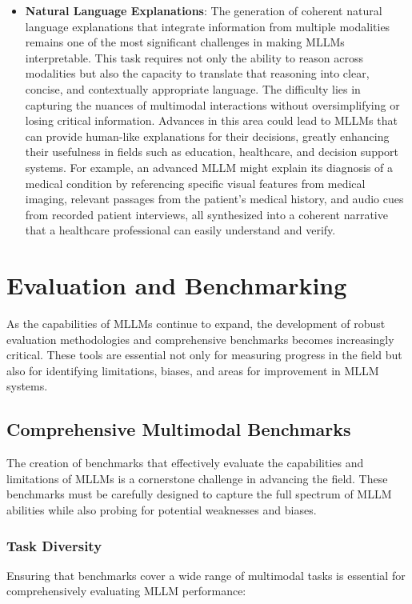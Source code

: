 \begin{itemize}
    \item \textbf{Natural Language Explanations}: The generation of coherent natural language explanations that integrate information from multiple modalities remains one of the most significant challenges in making MLLMs interpretable. This task requires not only the ability to reason across modalities but also the capacity to translate that reasoning into clear, concise, and contextually appropriate language. The difficulty lies in capturing the nuances of multimodal interactions without oversimplifying or losing critical information. Advances in this area could lead to MLLMs that can provide human-like explanations for their decisions, greatly enhancing their usefulness in fields such as education, healthcare, and decision support systems. For example, an advanced MLLM might explain its diagnosis of a medical condition by referencing specific visual features from medical imaging, relevant passages from the patient's medical history, and audio cues from recorded patient interviews, all synthesized into a coherent narrative that a healthcare professional can easily understand and verify.
\end{itemize}

\section{Evaluation and Benchmarking}

As the capabilities of MLLMs continue to expand, the development of robust evaluation methodologies and comprehensive benchmarks becomes increasingly critical. These tools are essential not only for measuring progress in the field but also for identifying limitations, biases, and areas for improvement in MLLM systems.

\subsection{Comprehensive Multimodal Benchmarks}
The creation of benchmarks that effectively evaluate the capabilities and limitations of MLLMs is a cornerstone challenge in advancing the field. These benchmarks must be carefully designed to capture the full spectrum of MLLM abilities while also probing for potential weaknesses and biases.

\subsubsection{Task Diversity}
Ensuring that benchmarks cover a wide range of multimodal tasks is essential for comprehensively evaluating MLLM performance:

